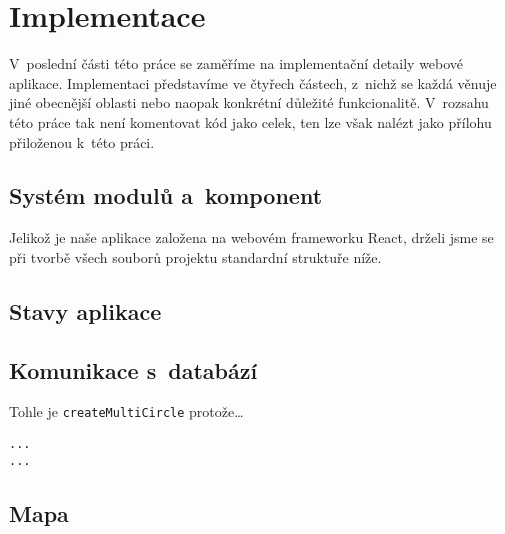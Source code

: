 \hypertarget{implementace}{%
\chapter{Implementace}\label{implementace}}

V~poslední části této práce se zaměříme na implementační detaily webové aplikace. Implementaci představíme ve čtyřech částech, z~nichž se každá věnuje jiné obecnější oblasti nebo naopak konkrétní důležité funkcionalitě. V~rozsahu této práce tak není komentovat kód jako celek, ten lze však nalézt jako přílohu přiloženou k~této práci.

\hypertarget{systuxe9m-modulux16f-a-komponent}{%
\section{Systém modulů a~komponent}\label{systuxe9m-modulux16f-a-komponent}}

Jelikož je naše aplikace založena na webovém frameworku React, drželi jsme se při tvorbě všech souborů projektu standardní struktuře níže.


\hypertarget{stavy-aplikace}{%
\section{Stavy aplikace}\label{stavy-aplikace}}

\hypertarget{komunikace-s-databuxe1zuxed}{%
\section{Komunikace s~databází}\label{komunikace-s-databuxe1zuxed}}

Tohle je \verb|createMultiCircle| protože\ldots{}

\begin{verbatim}
...
...
\end{verbatim}

\hypertarget{mapa}{%
\section{Mapa}\label{mapa}}
